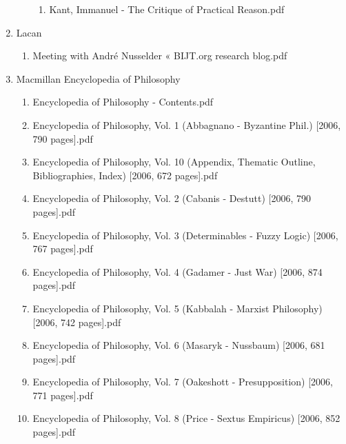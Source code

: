 \documentclass[11pt]{article}
\begin{document}
\begin{enumerate}
\begin{enumerate}
\begin{enumerate}
\item Kant, Immanuel - The Critique of Practical Reason.pdf
\label{sec-1-1-1-1-34-40-4-2}
\end{enumerate}
\end{enumerate}

\item Lacan
\label{sec-1-1-1-1-34-41}
\begin{enumerate}
\item Meeting with André Nusselder « BIJT.org research blog.pdf
\label{sec-1-1-1-1-34-41-1}
\end{enumerate}

\item Macmillan Encyclopedia of Philosophy
\label{sec-1-1-1-1-34-42}
\begin{enumerate}
\item Encyclopedia of Philosophy - Contents.pdf
\label{sec-1-1-1-1-34-42-1}

\item Encyclopedia of Philosophy, Vol. 1 (Abbagnano - Byzantine Phil.) [2006, 790 pages].pdf
\label{sec-1-1-1-1-34-42-2}

\item Encyclopedia of Philosophy, Vol. 10 (Appendix, Thematic Outline, Bibliographies, Index) [2006, 672 pages].pdf
\label{sec-1-1-1-1-34-42-3}

\item Encyclopedia of Philosophy, Vol. 2 (Cabanis - Destutt) [2006, 790 pages].pdf
\label{sec-1-1-1-1-34-42-4}

\item Encyclopedia of Philosophy, Vol. 3 (Determinables - Fuzzy Logic) [2006, 767 pages].pdf
\label{sec-1-1-1-1-34-42-5}

\item Encyclopedia of Philosophy, Vol. 4 (Gadamer - Just War) [2006, 874 pages].pdf
\label{sec-1-1-1-1-34-42-6}

\item Encyclopedia of Philosophy, Vol. 5 (Kabbalah - Marxist Philosophy) [2006, 742 pages].pdf
\label{sec-1-1-1-1-34-42-7}

\item Encyclopedia of Philosophy, Vol. 6 (Masaryk - Nussbaum) [2006, 681 pages].pdf
\label{sec-1-1-1-1-34-42-8}

\item Encyclopedia of Philosophy, Vol. 7 (Oakeshott - Presupposition) [2006, 771 pages].pdf
\label{sec-1-1-1-1-34-42-9}

\item Encyclopedia of Philosophy, Vol. 8 (Price - Sextus Empiricus) [2006, 852 pages].pdf
\label{sec-1-1-1-1-34-42-10}


\end{enumerate}
\end{enumerate}
\end{document}
